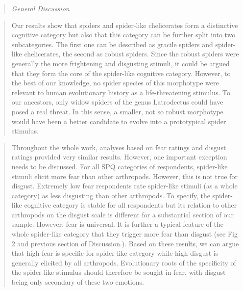 \documentclass[
]{book}
\begin{document}
\begin{quote}
\emph{General Discussion}
\end{quote}

\begin{quote}
Our results show that spiders and spider-like chelicerates form a distinctive cognitive category but also that this category can be further split into two subcategories. The first one can be described as gracile spiders and spider-like chelicerates, the second as robust spiders. Since the robust spiders were generally the more frightening and disgusting stimuli, it could be argued that they form the core of the spider-like cognitive category. However, to the best of our knowledge, no spider species of this morphotype were relevant to human evolutionary history as a life-threatening stimulus. To our ancestors, only widow spiders of the genus Latrodectus could have posed a real threat. In this sense, a smaller, not so robust morphotype would have been a better candidate to evolve into a prototypical spider stimulus.
\end{quote}

\begin{quote}
Throughout the whole work, analyses based on fear ratings and disgust ratings provided very similar results. However, one important exception needs to be discussed. For all SPQ categories of respondents, spider-like stimuli elicit more fear than other arthropods. However, this is not true for disgust. Extremely low fear respondents rate spider-like stimuli (as a whole category) as less disgusting than other arthropods. To specify, the spider-like cognitive category is stable for all respondents but its relation to other arthropods on the disgust scale is different for a substantial section of our sample. However, fear is universal. It is further a typical feature of the whole spider-like category that they trigger more fear than disgust (see Fig 2 and previous section of Discussion.). Based on these results, we can argue that high fear is specific for spider-like category while high disgust is generally elicited by all arthropods. Evolutionary roots of the specificity of the spider-like stimulus should therefore be sought in fear, with disgust being only secondary of these two emotions.
\end{quote}
\end{document}
